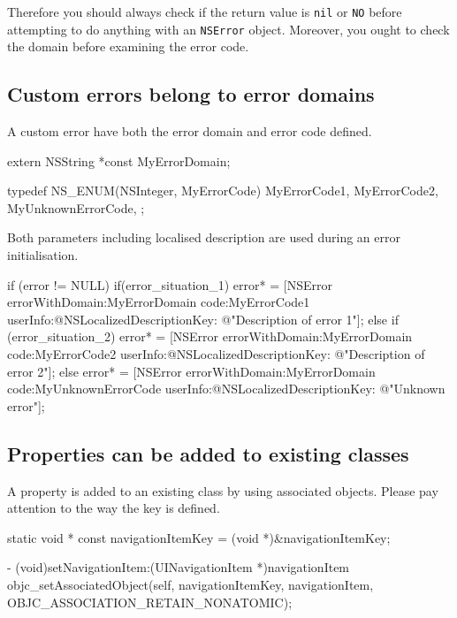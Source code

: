 \documentclass[10pt]{extarticle}
\newenvironment{codelisting}
{\footnotesize\mdframed[middlelinewidth=0.5pt, middlelinecolor=BaliHaiColor, skipabove=15pt]\verbatim}
{\endverbatim\endmdframed\vspace{12pt}\normalsize}
\newcommand{\inlinecode}[1]{{\textcolor{TundoraColor}{\texttt{#1}}}}
\begin{document}
Therefore you should always check if the return value is \inlinecode{nil} or \inlinecode{NO} before attempting to do anything with an \inlinecode{NSError} object. Moreover, you ought to check the domain before examining the error code.


\subsection{Custom errors belong to error domains}

A custom error have both the error domain and error code defined.

\begin{codelisting}
extern NSString *const MyErrorDomain;

typedef NS_ENUM(NSInteger, MyErrorCode) {
    MyErrorCode1,
    MyErrorCode2,
    MyUnknownErrorCode,
};
\end{codelisting}

Both parameters including localised description are used during an error initialisation.

\begin{codelisting}
if (error != NULL) {
    if(error_situation_1) {
        error* = [NSError errorWithDomain:MyErrorDomain 
                                     code:MyErrorCode1
                                 userInfo:@{NSLocalizedDescriptionKey: @"Description of error 1"}];
    }
    else if (error_situation_2) {
        error* = [NSError errorWithDomain:MyErrorDomain 
                                     code:MyErrorCode2
                                 userInfo:@{NSLocalizedDescriptionKey: @"Description of error 2"}];
    }
    else {
        error* = [NSError errorWithDomain:MyErrorDomain 
                                     code:MyUnknownErrorCode
                                 userInfo:@{NSLocalizedDescriptionKey: @"Unknown error"}];
    }
}
\end{codelisting}


\subsection{Properties can be added to existing classes}

A property is added to an existing class by using associated objects. Please pay attention to the way the key is defined.

\begin{codelisting}
static void * const navigationItemKey = (void *)&navigationItemKey;

- (void)setNavigationItem:(UINavigationItem *)navigationItem
{
    objc_setAssociatedObject(self, 
                             navigationItemKey, 
                             navigationItem, 
                             OBJC_ASSOCIATION_RETAIN_NONATOMIC);
}
\end{codelisting}
\end{document}

